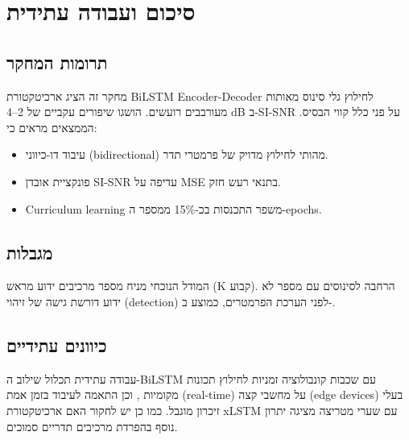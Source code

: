 
\clearpage
\chapter{סיכום ועבודה עתידית}

\section{תרומות המחקר}

מחקר זה הציג ארכיטקטורת \textenglish{BiLSTM Encoder-Decoder} לחילוץ גלי סינוס מאותות מעורבבים רועשים. הושגו שיפורים עקביים של \textenglish{2--4 dB} ב-\textenglish{SI-SNR} על פני כלל קווי הבסיס. הממצאים מראים כי:

\begin{itemize}
\item עיבוד דו-כיווני (\textenglish{bidirectional}) מהותי לחילוץ מדויק של פרמטרי תדר.
\item פונקציית אובדן \textenglish{SI-SNR} עדיפה על \textenglish{MSE} בתנאי רעש חזק.
\item \textenglish{Curriculum learning} משפר התכנסות בכ-\textenglish{15\%} ממספר ה-\textenglish{epochs}.
\end{itemize}

\section{מגבלות}

המודל הנוכחי מניח מספר מרכיבים ידוע מראש (\textenglish{K} קבוע). הרחבה לסינוסים עם מספר לא ידוע דורשת גישה של זיהוי (\textenglish{detection}) לפני הערכת הפרמטרים, כמוצע ב-\cite{nachmani2020voice}.

\section{כיוונים עתידיים}

עבודה עתידית תכלול שילוב ה-\textenglish{BiLSTM} עם שכבות קונבולוציה זמניות לחילוץ תכונות מקומיות \cite{luo2019convtasnet}, וכן התאמה לעיבוד בזמן אמת (\textenglish{real-time}) על מחשבי קצה (\textenglish{edge devices}) בעלי זיכרון מוגבל. כמו כן יש לחקור האם ארכיטקטורת \textenglish{xLSTM} \cite{hochreiter1997lstm} עם שערי מטריצה מציגה יתרון נוסף בהפרדת מרכיבים תדריים סמוכים.
